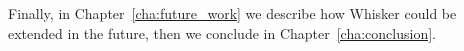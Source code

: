 Finally, in Chapter~\ref{cha:future_work} we describe how Whisker could be extended in the future,
then we conclude in Chapter~\ref{cha:conclusion}.

%
